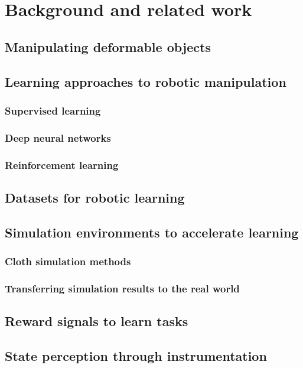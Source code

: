 \documentclass[\home/main.tex]{subfiles}
\begin{document}
\chapter{Background and related work}\label{ch:sota} 
\section{Manipulating deformable objects} 

\section{Learning approaches to robotic manipulation} %
\subsection{Supervised learning}
\subsection{Deep neural networks}
\subsection{Reinforcement learning}

\section{Datasets for robotic learning}
\section{Simulation environments to accelerate learning}
\subsection{Cloth simulation methods}
\subsection{Transferring simulation results to the real world}
\section{Reward signals to learn tasks}
\section{State perception through instrumentation}
\end{document}
